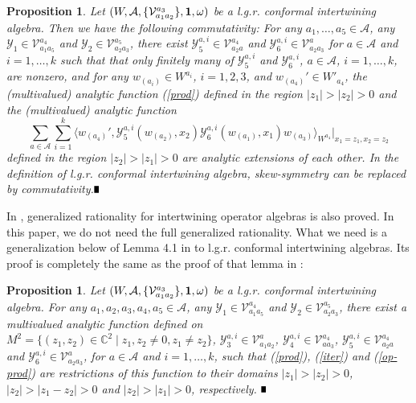 \documentclass{amsproc}
\newtheorem{prop}[thm]{Proposition}
\theoremstyle{definition}
\theoremstyle{remark}
\newcommand{\halmos}{\rule{1ex}{1.4ex}}
\newcommand{\epf}{\hspace*{\fill}\mbox{$\halmos$}}
\numberwithin{equation}{section}
\begin{document}
\begin{prop}\label{commu}
Let $(W, 
\mathcal{A}, \{\mathcal{V}_{a_{1}a_{2}}^{a_{3}}\}, {\bf 1}, \omega)$ 
be a l.g.r. conformal 
intertwining algebra. Then we have the following
{\it commutativity}: For any $a_{1}, \dots, a_{5}\in \mathcal{A}$,
any $\mathcal{Y}_{1}\in \mathcal{
V}_{a_{1}a_{5}}^{a_{4}}$ and $\mathcal{Y}_{2}\in\mathcal{
V}_{a_{2}a_{3}}^{a_{5}}$, there exist 
$\mathcal{Y}^{a,i}_{5}
\in \mathcal{
V}_{a_{2}a}^{a_{4}}$ and $\mathcal{Y}^{a, i}_{6}\in \mathcal{
V}_{a_{2}a_{3}}^{a}$ for $a\in \mathcal{A}$ and $i=1, \dots, k$
such that that only finitely many of $\mathcal{Y}^{a, i}_{5}$ and 
$\mathcal{Y}^{a,i}_{6}$, 
$a\in \mathcal{A}$, $i=1, \dots, k$, are nonzero, and 
for any $w_{(a_{i})}\in W^{a_{i}}$, $i=1, 2, 3$, and $w_{(a_{4})}'
\in W'_{a_{4}}$,
the (multivalued) analytic function 
(\ref{prod})
defined in the region
$|z_{1}|>|z_{2}|>0$ 
and the (multivalued) analytic function
\begin{equation}\label{op-prod}
\sum_{a\in \mathcal{A}}\sum_{i=1}^{k}\langle w_{(a_{4})}', 
\mathcal{Y}^{a, i}_{5}(w_{(a_{2})}, x_{2})\mathcal{Y}^{a, i}_{6}(w_{(a_{1})}, 
x_{1})w_{(a_{3})}\rangle_{W^{a_{4}}}|_{x_{1}=z_{1},
x_{2}=z_{2}}
\end{equation}
defined in the region $|z_{2}|>|z_{1}|>0$ 
 are analytic extensions of each other.
In the definition of l.g.r. conformal 
intertwining algebra, skew-symmetry 
can be replaced by  commutativity.\epf
\end{prop}





In \cite{H6}, generalized rationality for intertwining operator 
algebras is also proved.   In this paper, we do not need the 
full generalized rationality. What we need is a generalization below
of Lemma 4.1 in \cite{H6} to
l.g.r. conformal 
intertwining algebras. Its proof is 
completely the same as the proof of that lemma in \cite{H6}:


\begin{prop}\label{correl1}
Let $(W, 
\mathcal{A}, \{\mathcal{V}_{a_{1}a_{2}}^{a_{3}}\}, {\bf 1}, \omega)$ 
be a l.g.r. conformal 
intertwining algebra. For any $a_{1}, a_{2}, a_{3}, a_{4},
a_{5}\in \mathcal{A}$, any $\mathcal{Y}_{1}\in \mathcal{
V}_{a_{1}a_{5}}^{a_{4}}$ and $\mathcal{Y}_{2}\in\mathcal{
V}_{a_{2}a_{3}}^{a_{5}}$, there exist a 
multivalued analytic function defined on $M^{2}=\{(z_{1},
z_{2})\in \mathbb{C}^{2}\;|\;z_{1}, z_{2}\ne 0, z_{1}\ne
z_{2}\}$,
$\mathcal{Y}^{a, i}_{3}
\in \mathcal{
V}_{a_{1}a_{2}}^{a}$,  $\mathcal{Y}^{a,i}_{4}\in \mathcal{
V}_{aa_{3}}^{a_{4}}$, $\mathcal{Y}^{a,i}_{5}
\in \mathcal{
V}_{a_{2}a}^{a_{4}}$ and $\mathcal{Y}^{a, i}_{6}\in \mathcal{
V}_{a_{2}a_{3}}^{a}$, for $a\in \mathcal{A}$ and $i=1, \dots, k$,
 such that (\ref{prod}), (\ref{iter}) and (\ref{op-prod}) 
are restrictions of this function to their domains 
$|z_{1}|>|z_{2}|>0$, $|z_{2}|>|z_{1}-z_{2}|>0$ and
$|z_{2}|>|z_{1}|>0$, respectively. \epf
\end{prop}
\end{document}

